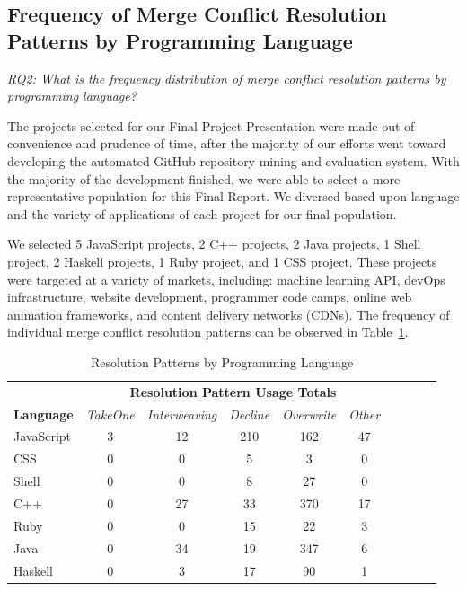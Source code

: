 \documentclass{sig-alternate-05-2015}
\begin{document}
\subsection{Frequency of Merge Conflict Resolution Patterns by Programming Language}
\textit{RQ2: What is the frequency distribution of merge conflict resolution patterns by programming language?}

The projects selected for our Final Project Presentation were made out of convenience and prudence of time, after the majority of our efforts went toward developing the automated GitHub repository mining and evaluation system. With the majority of the development finished, we were able to select a more representative population for this Final Report. We diversed based upon language and the variety of applications of each project for our final population.

We selected 5 JavaScript projects, 2 C++ projects, 2 Java projects, 1 Shell project, 2 Haskell projects, 1 Ruby project, and 1 CSS project. These projects were targeted at a variety of markets, including: machine learning API, devOps infrastructure, website development, programmer code camps, online web animation frameworks, and content delivery networks (CDNs). The frequency of individual merge conflict resolution patterns can be observed in Table~\ref{table:t3}.

\begin{table}[!htbp]
\centering
\caption{Resolution Patterns by Programming Language}
\begin{tabular}{| l | c | c | c | c | c | c | c | c | c | } \hline
\toprule
& \multicolumn{5}{c}{\textbf{Resolution Pattern Usage Totals}} \\
\textbf{Language} & \textit{TakeOne} & \textit{Interweaving} & \textit{Decline} & \textit{Overwrite} & \textit{Other} \\ \hline
JavaScript & 3 & 12 & 210 & 162 & 47 \\ \hline
CSS & 0 & 0 & 5 & 3 & 0 \\ \hline
Shell & 0 & 0 & 8 & 27 & 0 \\ \hline
C++ & 0 & 27 & 33 & 370 & 17 \\ \hline
Ruby & 0 & 0 & 15 & 22 & 3 \\ \hline
Java & 0 & 34 & 19 & 347 & 6 \\ \hline
Haskell & 0 & 3 & 17 & 90 & 1 \\ \hline
\end{tabular}
\label{table:t3}
\end{table}
\end{document}
